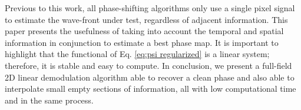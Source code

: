 Previous to this work, all phase-shifting algorithms only use a single pixel
signal to estimate the wave-front under test, regardless of adjacent
information. This paper presents the usefulness of taking into account the
temporal and spatial information in conjunction to estimate a best phase
map. It is important to highlight that the functional of Eq. \eqref{eq:psi
regularized} is a linear system; therefore, it is stable and easy to compute. 
In conclusion, we present a full-field 2D linear demodulation algorithm  able 
to recover a clean phase and also able to interpolate small empty sections of
information, all with low computational time and in the same process.







  
  
  

  
  
 
 

 
  
  
